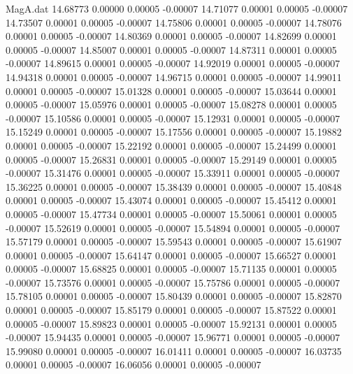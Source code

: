 \begin{filecontents}{MagA.dat}
  14.68773    0.00000    0.00005   -0.00007
  14.71077    0.00001    0.00005   -0.00007
  14.73507    0.00001    0.00005   -0.00007
  14.75806    0.00001    0.00005   -0.00007
  14.78076    0.00001    0.00005   -0.00007
  14.80369    0.00001    0.00005   -0.00007
  14.82699    0.00001    0.00005   -0.00007
  14.85007    0.00001    0.00005   -0.00007
  14.87311    0.00001    0.00005   -0.00007
  14.89615    0.00001    0.00005   -0.00007
  14.92019    0.00001    0.00005   -0.00007
  14.94318    0.00001    0.00005   -0.00007
  14.96715    0.00001    0.00005   -0.00007
  14.99011    0.00001    0.00005   -0.00007
  15.01328    0.00001    0.00005   -0.00007
  15.03644    0.00001    0.00005   -0.00007
  15.05976    0.00001    0.00005   -0.00007
  15.08278    0.00001    0.00005   -0.00007
  15.10586    0.00001    0.00005   -0.00007
  15.12931    0.00001    0.00005   -0.00007
  15.15249    0.00001    0.00005   -0.00007
  15.17556    0.00001    0.00005   -0.00007
  15.19882    0.00001    0.00005   -0.00007
  15.22192    0.00001    0.00005   -0.00007
  15.24499    0.00001    0.00005   -0.00007
  15.26831    0.00001    0.00005   -0.00007
  15.29149    0.00001    0.00005   -0.00007
  15.31476    0.00001    0.00005   -0.00007
  15.33911    0.00001    0.00005   -0.00007
  15.36225    0.00001    0.00005   -0.00007
  15.38439    0.00001    0.00005   -0.00007
  15.40848    0.00001    0.00005   -0.00007
  15.43074    0.00001    0.00005   -0.00007
  15.45412    0.00001    0.00005   -0.00007
  15.47734    0.00001    0.00005   -0.00007
  15.50061    0.00001    0.00005   -0.00007
  15.52619    0.00001    0.00005   -0.00007
  15.54894    0.00001    0.00005   -0.00007
  15.57179    0.00001    0.00005   -0.00007
  15.59543    0.00001    0.00005   -0.00007
  15.61907    0.00001    0.00005   -0.00007
  15.64147    0.00001    0.00005   -0.00007
  15.66527    0.00001    0.00005   -0.00007
  15.68825    0.00001    0.00005   -0.00007
  15.71135    0.00001    0.00005   -0.00007
  15.73576    0.00001    0.00005   -0.00007
  15.75786    0.00001    0.00005   -0.00007
  15.78105    0.00001    0.00005   -0.00007
  15.80439    0.00001    0.00005   -0.00007
  15.82870    0.00001    0.00005   -0.00007
  15.85179    0.00001    0.00005   -0.00007
  15.87522    0.00001    0.00005   -0.00007
  15.89823    0.00001    0.00005   -0.00007
  15.92131    0.00001    0.00005   -0.00007
  15.94435    0.00001    0.00005   -0.00007
  15.96771    0.00001    0.00005   -0.00007
  15.99080    0.00001    0.00005   -0.00007
  16.01411    0.00001    0.00005   -0.00007
  16.03735    0.00001    0.00005   -0.00007
  16.06056    0.00001    0.00005   -0.00007

\end{filecontents}

